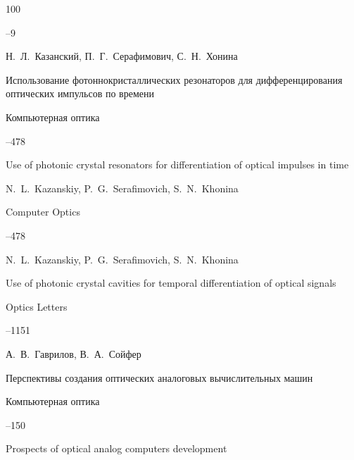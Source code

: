 \begin{thebibliography}{100}

--9






\by Н.~Л.~Казанский, П.~Г.~Серафимович, С.~Н.~Хонина

\paper Использование фотоннокристаллических резонаторов для дифференцирования оптических импульсов по времени

\jour Компьютерная оптика




--478

\misctransl

\paper Use of photonic crystal resonators for differentiation of optical impulses in time

\by N.~L.~Kazanskiy, P.~G.~Serafimovich, S.~N.~Khonina


\jour Computer Optics 



--478






\by N.~L.~Kazanskiy, P.~G.~Serafimovich, S.~N.~Khonina

\paper Use of photonic crystal cavities for temporal differentiation of optical signals

\jour Optics Letters




--1151




\by А.~В.~Гаврилов, В.~А.~Сойфер

\paper Перспективы создания оптических  аналоговых вычислительных машин

\jour Компьютерная оптика




--150

\misctransl

\paper Prospects of optical analog computers development


\end{thebibliography}
